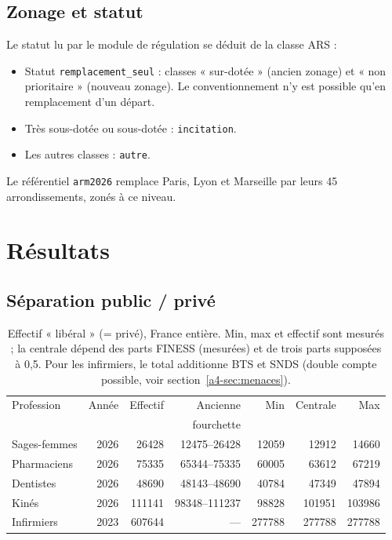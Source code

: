 \subsection{Zonage et statut}
Le statut lu par le module de régulation se déduit de la classe ARS :
\begin{itemize}
  \item Statut \texttt{remplacement\_seul} : classes « sur-dotée » (ancien zonage) et « non prioritaire »
  (nouveau zonage). Le conventionnement n'y est possible qu'en remplacement d'un départ.
  \item Très sous-dotée ou sous-dotée : \texttt{incitation}.
  \item Les autres classes : \texttt{autre}.
\end{itemize}
Le référentiel \texttt{arm2026} remplace Paris, Lyon et Marseille par leurs 45 arrondissements, zonés à ce niveau.

\section{Résultats}
\subsection{Séparation public / privé}\label{a4-sec:res-secteur}
\begin{table}[h]
\centering\small
\setlength{\tabcolsep}{4pt}
\begin{tabular}{@{}lrrrrrr@{}}
\toprule
Profession & Année & Effectif & Ancienne & Min & Centrale & Max \\
 & & & fourchette & & & \\
\midrule
Sages-femmes & 2026 & \num{26428} & \num{12475}--\num{26428} & \num{12059} & \num{12912} & \num{14660} \\
Pharmaciens  & 2026 & \num{75335} & \num{65344}--\num{75335} & \num{60005} & \num{63612} & \num{67219} \\
Dentistes    & 2026 & \num{48690} & \num{48143}--\num{48690} & \num{40784} & \num{47349} & \num{47894} \\
Kinés        & 2026 & \num{111141} & \num{98348}--\num{111237} & \num{98828} & \num{101951} & \num{103986} \\
Infirmiers   & 2023 & \num{607644} & --- & \num{277788} & \num{277788} & \num{277788} \\
\bottomrule
\end{tabular}
\caption{Effectif « libéral » (= privé), France entière. Min, max et effectif sont mesurés\mesure{} ; la centrale
dépend des parts FINESS (mesurées\mesure{}) et de trois parts supposées à 0,5\suppose{}. Pour les infirmiers, le
total additionne BTS et SNDS (double compte possible, voir section~\ref{a4-sec:menaces}).}
\label{a4-tab:fourchettes}
\end{table}

